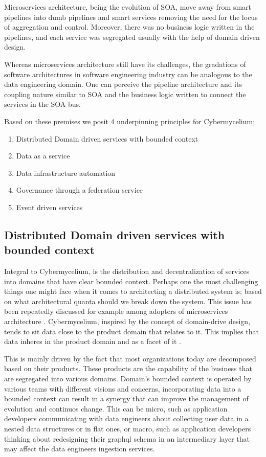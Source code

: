 \documentclass[review]{elsarticle}
\begin{document}
Microservices architecture, being the evolution of SOA, move away from smart pipelines into dumb pipelines and smart services removing the need for the locus of aggregation and control. Moreover, there was no business logic written in the pipelines, and each service was segregated usually with the help of domain driven design.

Whereas microservices architecture still have its challenges, the gradations of software architectures in software engineering industry can be analogous to the data engineering domain. One can perceive the pipeline architecture and its coupling nature similar to SOA and the business logic written to connect the services in the SOA bus.

Based on these premises we posit 4 underpinning principles for Cybermycelium;

\begin{enumerate}
    \item Distributed Domain driven services with bounded context
    \item Data as a service
    \item Data infrastructure automation
    \item Governance through a federation service
    \item Event driven services

\end{enumerate}

\subsection{Distributed Domain driven services with bounded context}

Integral to Cybermycelium, is the distribution and decentralization of services into domains that have clear bounded context. Perhaps one the most challenging things one might face when it comes to architecting a distributed system is; based on what architectural quanta should we break down the system. This issue has been repeatedly discussed for example among adopters of microservices architecture . Cybermycelium, inspired by the concept of domain-drive design, tends to sit data close to the product domain that relates to it. This implies that data inheres in the product domain and as a facet of it \cite{laigner2021data}.

This is mainly driven by the fact that most organizations today are decomposed based on their products. These products are the capability of the business that are segregated into various domains. Domain's bounded context is operated by various teams with different visions and concerns, incorporating data into a bounded context can result in a synergy that can improve the management of evolution and continuos change. This can be micro, such as application developers communicating with data engineers about collecting user data in a nested data structures or in flat ones, or macro, such as application developers thinking about redesigning their graphql schema in an intermediary layer that may affect the data engineers ingestion services.
\end{document}
